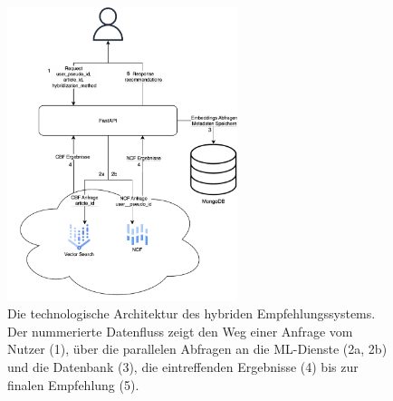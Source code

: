 \begin{figure}[htbp]
    \centering
    \includegraphics[width=0.6\textwidth]{content/figures/svg/architektur.pdf}
    \caption{Die technologische Architektur des hybriden Empfehlungssystems. Der nummerierte Datenfluss zeigt den Weg einer Anfrage vom Nutzer (1), 
    über die parallelen Abfragen an die ML-Dienste (2a, 2b) und die Datenbank (3), die eintreffenden Ergebnisse (4) bis zur finalen Empfehlung (5).}
    \label{fig:architektur}
\end{figure}